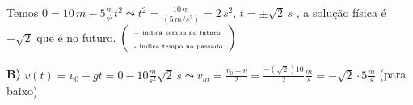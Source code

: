 \documentclass{beamer}
\begin{document}
\begin{frame}{}
		\vspace{0.1cm}
		Temos $0 = 10\,m - 5\frac{m}{s^2}t^2  \leadsto  t^2 = \frac{10\,m}{(5\,m/s^2)} = 2\,s^2$, 
		$t = \pm\sqrt{2}\,s$ , a solução física é $+\sqrt{2}$ que é no futuro. \quad $\left( \begin{array}{l} \text{\tiny + indica tempo no futuro} \\ \text{\tiny - indica tempo no passado} \end{array} \right)$
		
		\vspace{0.1cm}
		\textbf{B)} $\displaystyle v(t) = v_0 - g t = 0 - 10\frac{m}{s^2}\sqrt{2}\,s \leadsto v_m = \frac{v_0 + v}{2} = \frac{-(\sqrt{2})10}{2}\frac{m}{s} = -\sqrt{2} \cdot 5\frac{m}{s}$  (para baixo)
	\end{frame}
	
\end{document}

